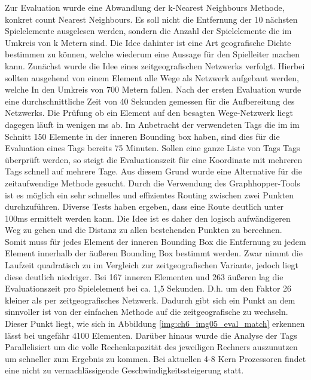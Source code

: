 Zur Evaluation wurde eine Abwandlung der k-Nearest Neighbours Methode, konkret count Nearest Neighbours.
Es soll nicht die Entfernung der 10 nächsten Spielelemente ausgelesen werden, sondern die Anzahl der Spielelemente die im  Umkreis von k Metern sind. Die Idee dahinter ist eine Art geografische Dichte bestimmen zu können, welche wiederum eine Aussage für den Spielleiter machen kann.
Zunächst wurde die Idee eines zeitgeografischen Netzwerks verfolgt. Hierbei sollten ausgehend von einem Element alle Wege als Netzwerk aufgebaut werden, welche In den Umkreis von 700 Metern fallen. Nach der ersten Evaluation wurde eine durchschnittliche Zeit von 40 Sekunden gemessen für die Aufbereitung des Netzwerks. Die Prüfung ob ein Element auf den besagten Wege-Netzwerk liegt dagegen läuft in wenigen ms ab.
Im Anbetracht der verwendeten Tags die im im Schnitt 150 Elemente in der inneren Bounding box haben, sind dies für die Evaluation eines Tags  
bereits 75 Minuten. Sollen eine ganze Liste von Tags Tags überprüft werden, so steigt die Evaluationszeit für eine Koordinate mit mehreren Tags schnell auf mehrere Tage.
Aus diesem Grund wurde eine Alternative für die zeitaufwendige Methode gesucht.
Durch die Verwendung des Graphhopper-Tools ist es möglich ein sehr schnelles und effizientes Routing zwischen zwei Punkten durchzuführen.
Diverse Tests haben ergeben, dass eine Route deutlich unter 100ms ermittelt werden kann. Die Idee ist es daher den logisch aufwändigeren Weg zu gehen und die Distanz zu allen bestehenden Punkten zu berechnen. Somit muss für jedes Element der inneren Bounding Box die Entfernung zu jedem Element innerhalb der äußeren Bounding Box bestimmt werden. Zwar nimmt die Laufzeit quadratisch zu im Vergleich zur zeitgeografischen Variante, jedoch liegt diese deutlich niedriger. Bei 167 inneren Elementen und 263 äußeren lag die Evaluationszeit pro Spielelement bei ca. 1,5 Sekunden. D.h. um den Faktor 26 kleiner als per zeitgeografisches Netzwerk. Dadurch gibt sich ein Punkt an dem sinnvoller ist von der einfachen Methode auf die zeitgeografische zu wechseln.
Dieser Punkt liegt, wie sich in Abbildung \ref{img:ch6_img05_eval_match} erkennen lässt bei ungefähr 4100 Elementen.
Darüber hinaus wurde die Analyse der Tags Parallelisiert um die volle Rechenkapazität des jeweiligen Rechners auszunutzen um schneller zum Ergebnis zu kommen. Bei aktuellen 4-8 Kern Prozessoren findet eine nicht zu vernachlässigende Geschwindigkeitssteigerung statt.

